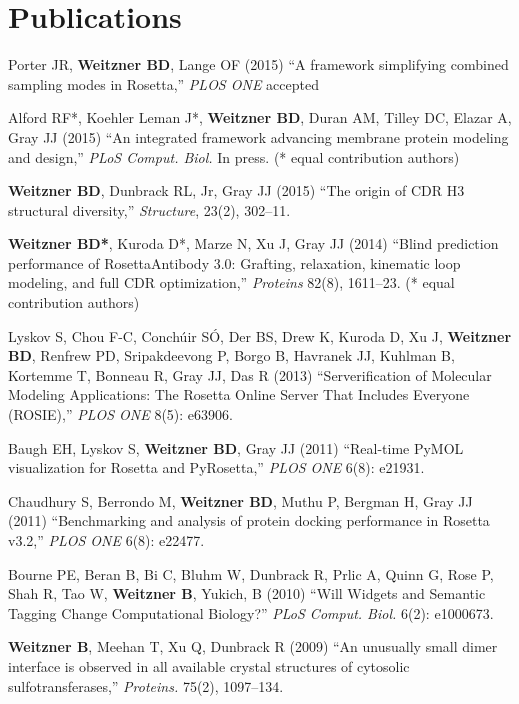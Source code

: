 \documentclass[12pt]{article}
\newcommand{\allcapsspacing}[1]{{\addfontfeature{LetterSpace=7.5}#1}}
\begin{document}
\section*{\allcapsspacing{Publications}}
\begin{etaremune}
\item Porter JR, \textbf{Weitzner BD}, Lange OF (2015) ``A framework simplifying combined sampling modes in Rosetta,'' \textit{PLOS ONE} accepted
\item Alford RF*, Koehler Leman J*, \textbf{Weitzner BD}, Duran AM, Tilley DC, Elazar A, Gray JJ (2015) ``An integrated framework advancing membrane protein modeling and design,'' \textit{PLoS Comput. Biol.} In press. (* equal contribution authors)
\item \textbf{Weitzner BD}, Dunbrack RL, Jr, Gray JJ (2015) ``The origin of CDR H3 structural diversity,'' \textit{Structure}, 23(2), 302--11.
\item \textbf{Weitzner BD*}, Kuroda D*, Marze N, Xu J, Gray JJ (2014) ``Blind prediction performance of RosettaAntibody 3.0: Grafting, relaxation, kinematic loop modeling, and full CDR optimization,'' \textit{Proteins} 82(8), 1611--23. (* equal contribution authors)
\item Lyskov S, Chou F-C, Conch{\'u}ir S{\'O}, Der BS, Drew K, Kuroda D, Xu J, \textbf{Weitzner BD}, Renfrew PD, Sripakdeevong P, Borgo B, Havranek JJ, Kuhlman B, Kortemme T, Bonneau R, Gray JJ, Das R (2013) ``Serverification of Molecular Modeling Applications: The Rosetta Online Server That Includes Everyone (ROSIE),'' \textit{PLOS ONE} 8(5): e63906.
\item Baugh EH, Lyskov S, \textbf{Weitzner BD}, Gray JJ (2011) ``Real-time PyMOL visualization for Rosetta and PyRosetta,'' \textit{PLOS ONE} 6(8): e21931.
\item Chaudhury S, Berrondo M, \textbf{Weitzner BD}, Muthu P, Bergman H, Gray JJ (2011) ``Benchmarking and analysis of protein docking performance in Rosetta v3.2,'' \textit{PLOS ONE} 6(8): e22477.
\item Bourne PE, Beran B, Bi C, Bluhm W, Dunbrack R, Prlic A, Quinn G, Rose P, Shah R, Tao W, \textbf{Weitzner B}, Yukich, B (2010) ``Will Widgets and Semantic Tagging Change Computational Biology?'' \textit{PLoS Comput. Biol.} 6(2): e1000673.
\item \textbf{Weitzner B}, Meehan T, Xu Q, Dunbrack R (2009) ``An unusually small dimer interface is observed in all available crystal structures of cytosolic sulfotransferases,'' \textit{Proteins.} 75(2), 1097--134.
\end{etaremune}
\end{document}
